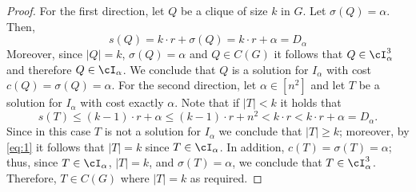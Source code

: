 {\begin{proof}
	For the first direction, let $Q$ be a clique of size $k$ in $G$. Let $\sigma(Q) = \alpha$. Then, \begin{equation*}
		\label{eq:D}
		s(Q) = k \cdot r+\sigma(Q) = k \cdot r+\alpha = D_{\alpha}
	\end{equation*} Moreover, since $|Q| = k$, $\sigma(Q) = \alpha$ and $Q \in C(G)$ it follows that $Q \in \cI^3_{\alpha}$ and therefore $Q \in \cI_{\alpha}$. We conclude that $Q$ is a solution for $I_{\alpha}$ with cost $c(Q) = \sigma(Q) = \alpha$. For the second direction, let $\alpha \in [n^2]$ and let $T$ be a solution for $I_{\alpha}$ with cost exactly $\alpha$. Note that if $|T| < k$ it holds that $$s(T) \leq (k-1) \cdot r+ \alpha \leq (k-1) \cdot r+n^2 < k \cdot r < k \cdot r+\alpha = D_{\alpha}.$$ Since in this case $T$ is not a solution for $I_{\alpha}$ we conclude that $|T| \geq k$; moreover, by \eqref{eq:1} it follows that $|T| = k$ since $T \in \cI_{\alpha}$.  In addition, $c(T) = \sigma(T) = \alpha$; thus, since $T \in \cI_{\alpha}$, $|T| = k$, and $\sigma(T) = \alpha$, we conclude that $T \in \cI^3_{\alpha}$. Therefore, $T \in C(G)$ where $|T| = k$ as required.  
\end{proof}

}
